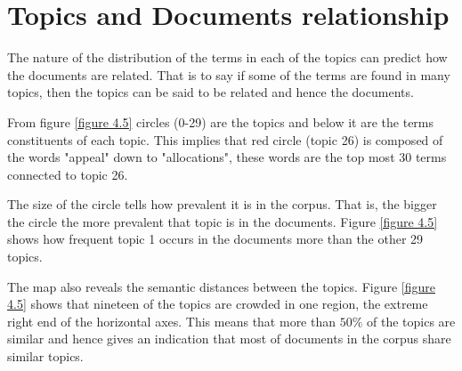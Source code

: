 \section{Topics and Documents relationship}
\begin{flushleft}
The nature of the distribution of the terms in each of the topics can predict how the documents are related. That is to say if some of the terms are found in many topics, then the topics can be said to be  related and hence the documents. 
\end{flushleft}
\begin{flushleft}
From figure \ref{figure 4.5} circles (0-29) are the topics and below it are the terms constituents of each topic. This implies that red circle (topic 26) is composed of the words "appeal" down to "allocations", these words are the top most 30 terms connected to topic 26.
\end{flushleft}
\begin{flushleft}
The size of the circle tells how prevalent it is in the corpus. That is, the bigger the circle the more prevalent that topic is in the documents. Figure \ref{figure 4.5} shows how frequent topic 1 occurs in the documents more than the other 29 topics.
\end{flushleft}
\begin{flushleft}
The map  also reveals the semantic distances between the topics. Figure \ref{figure 4.5} shows that nineteen of the topics are crowded in one region, the extreme  right end of the horizontal axes. This means that more than $50\%$ of the topics are similar and hence gives an indication that most of documents in the corpus share similar topics.
\end{flushleft}
